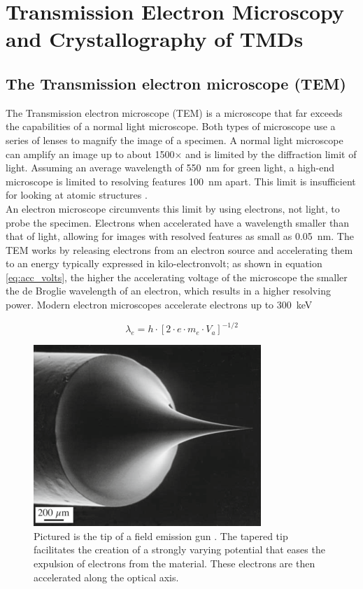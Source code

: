 \section{Transmission Electron Microscopy and Crystallography of TMDs}
\label{sec:theory}

\subsection{The Transmission electron microscope (TEM)}
The Transmission electron microscope (TEM) is a microscope that far exceeds the capabilities of a normal light microscope. Both types of microscope use a series of lenses to magnify the image of a specimen.
A normal light microscope can amplify an image up to about 1500$\times$ and is limited by the diffraction limit of light. Assuming an average wavelength of \SI{550}{\nm} for green light, a high-end microscope is limited to resolving features \SI{100}{\nm} apart.
This limit is insufficient for looking at atomic structures \cite{PhysRevLett.106.193905}.\\
An electron microscope circumvents this limit by using electrons, not light, to probe the specimen. Electrons when accelerated have a wavelength smaller than that of light, allowing for images with resolved features as small as \SI{0.05}{\nm}. \cite{kisielowski_freitag_bischoff_van}
The TEM works by releasing electrons from an electron source and accelerating them to an energy typically expressed in kilo-electronvolt; as shown in equation \ref{eq:acc_volts}, the higher the accelerating voltage of the microscope the smaller the de Broglie wavelength of an electron, which results in a higher resolving power. Modern electron microscopes accelerate electrons up to \SI{300}{\kilo \electronvolt}

\begin{equation}
    \lambda_e = h\cdot \left[ 2 \cdot e \cdot m_e \cdot V_a \right]^{-1/2}
    \label{eq:acc_volts}
\end{equation}

\begin{figure}[h]
    \centering
    \includegraphics[keepaspectratio, width=0.5\linewidth]{resources/Figures/feg.png} 
    \caption{Pictured is the tip of a field emission gun \cite{Williams2009-ww}. The tapered tip facilitates the creation of a strongly varying potential that eases the expulsion of electrons from the material. These electrons are then accelerated along the optical axis.}
    \label{fig:feg}
\end{figure}

